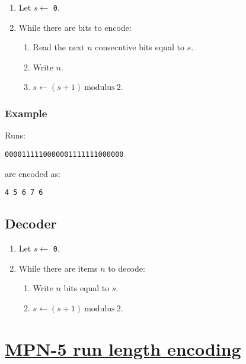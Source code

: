 \begin{enumerate}
\def\labelenumi{\arabic{enumi}.}
\tightlist
\item
  Let \(s\leftarrow\) \texttt{0}.
\item
  While there are bits to encode:

  \begin{enumerate}
  \def\labelenumii{\arabic{enumii}.}
  \tightlist
  \item
    Read the next \(n\) consecutive bits equal to \(s\).
  \item
    Write \(n\).
  \item
    \(s\leftarrow (s+1)~\text{modulus}~2\).
  \end{enumerate}
\end{enumerate}

    \hypertarget{example}{%
\subsubsection{Example}\label{example}}

Runs:

\begin{verbatim}
0000111110000001111111000000
\end{verbatim}

are encoded as:

\begin{verbatim}
4 5 6 7 6
\end{verbatim}

\subsection{Decoder}

\begin{enumerate}
\def\labelenumi{\arabic{enumi}.}
\tightlist
\item
  Let \(s\leftarrow\) \texttt{0}.
\item
  While there are items \(n\) to decode:

  \begin{enumerate}
  \def\labelenumii{\arabic{enumii}.}
  \tightlist
  \item
    Write \(n\) bits equal to \(s\).
  \item
    \(s\leftarrow (s+1)~\text{modulus}~2\).
  \end{enumerate}
\end{enumerate}

\section{\href{https://en.wikipedia.org/wiki/Microcom_Networking_Protocol\#MNP_5}{MPN-5 run length encoding}}

